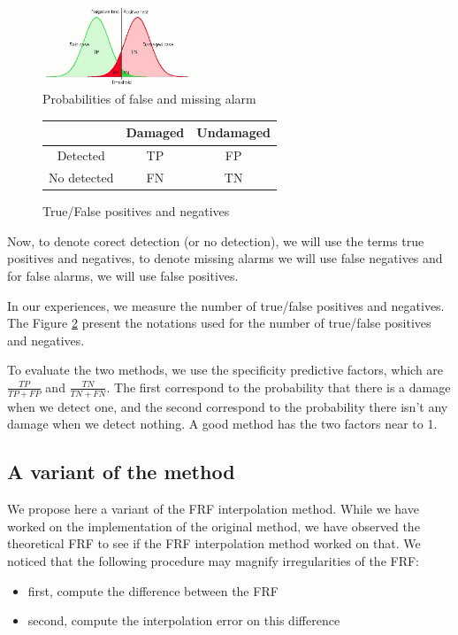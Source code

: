 \documentclass[journal]{IEEEtran}
\begin{document}
\begin{figure}[h!]
  \centering
  \includegraphics[width=0.4\textwidth]{images/gaussiennes.png}
  \caption{Probabilities of false and missing alarm}
  \label{proba}
\end{figure}

\begin{figure}[h!]
\begin{center}
\begin{tabular}{|c|c|c|}
\hline
\ & Damaged & Undamaged \\ \hline
Detected & TP & FP \\ \hline
No detected & FN & TN \\ \hline
\end{tabular}
\end{center}
\caption{True/False positives and negatives}
\label{TFPN}
\end{figure}

Now, to denote corect detection (or no detection), we will use the terms true positives and negatives, to denote missing alarms we will use false negatives and for false alarms, we will use false positives.

In our experiences, we measure the number of true/false positives and negatives. The Figure \ref{TFPN} present the notations used for the number of true/false positives and negatives.

To evaluate the two methods, we use the specificity predictive factors, which are
$\frac{TP}{TP + FP}$ and $\frac{TN}{TN + FN}$. The first correspond to the probability that there is a damage when we detect one, and the second correspond to the probability there isn't any damage when we detect nothing. A good method has the two factors near to 1.


\subsection{A variant of the method}

We propose here a variant of the FRF interpolation method. While we have worked on the implementation of the original method, we have observed the theoretical FRF to see if the FRF interpolation method worked on that. We noticed that the following procedure may magnify irregularities of the FRF:
\begin{itemize}
\item first, compute the difference between the FRF
\item second, compute the interpolation error on this difference
\end{itemize}
\end{document}
